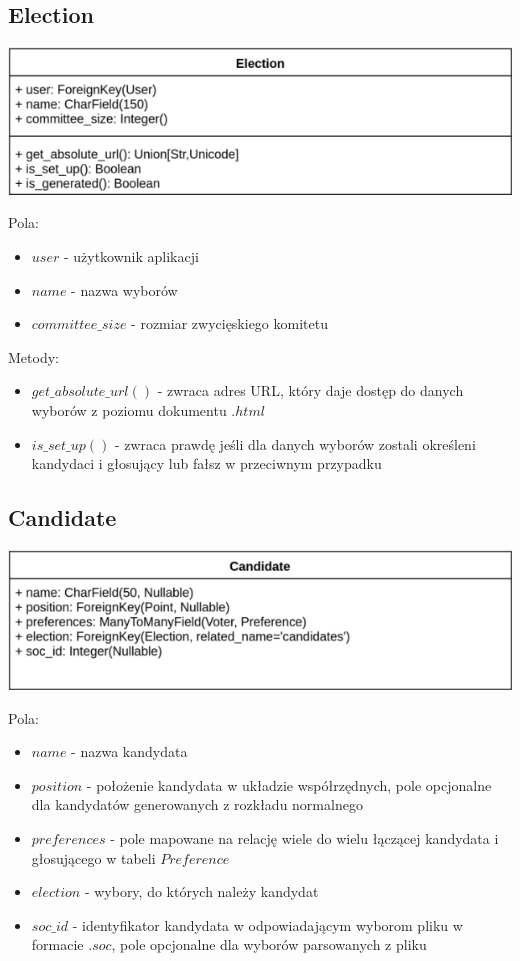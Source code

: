 \documentclass[pdflatex,11pt]{../aghdoc_version2}
\begin{document}
\subsection{Election}
\begin{center}
\centerline{\includegraphics[scale=0.85]{pics/Election.png}}
\end{center}
Pola:
\begin{itemize}
\item $user$ - użytkownik aplikacji
\item $name$ - nazwa wyborów
\item $committee\_size$ - rozmiar zwycięskiego komitetu
\end{itemize}
Metody:
\begin{itemize}
\item $get\_absolute\_url()$ - zwraca adres URL, który daje dostęp do danych wyborów z
poziomu dokumentu $.html$
\item $is\_set\_up()$ - zwraca prawdę jeśli dla danych wyborów zostali określeni kandydaci i
głosujący lub fałsz w przeciwnym przypadku
\end{itemize}

\subsection{Candidate}
\begin{center}
\centerline{\includegraphics[scale=0.85]{pics/Candidate.png}}
\end{center}
Pola:
\begin{itemize}
\item $name$ - nazwa kandydata
\item $position$ - położenie kandydata w układzie współrzędnych, pole opcjonalne dla
kandydatów generowanych z rozkładu normalnego
\item $preferences$ - pole mapowane na relację wiele do wielu łączącej kandydata i
głosującego w tabeli $Preference$
\item $election$ - wybory, do których należy kandydat
\item $soc\_id$ - identyfikator kandydata w odpowiadającym wyborom pliku w formacie $.soc$,
pole opcjonalne dla wyborów parsowanych z pliku
\end{itemize}
\end{document}
